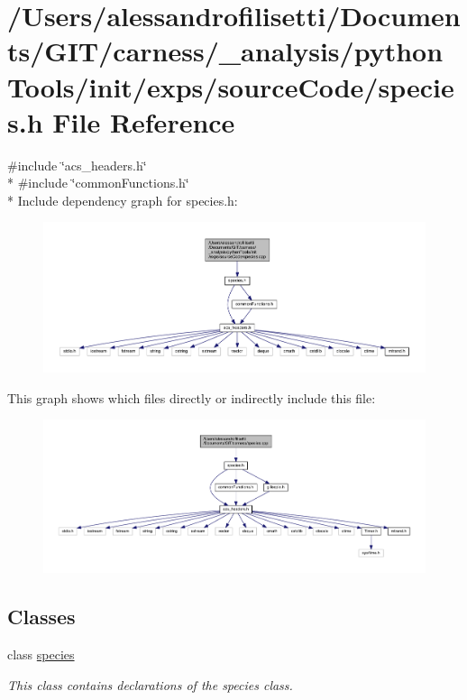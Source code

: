 \hypertarget{a00080}{\section{/\-Users/alessandrofilisetti/\-Documents/\-G\-I\-T/carness/\-\_\-analysis/python\-Tools/init/exps/source\-Code/species.h File Reference}
\label{a00080}
}
{\ttfamily \#include \char`\"{}acs\-\_\-headers.\-h\char`\"{}}\\*
{\ttfamily \#include \char`\"{}common\-Functions.\-h\char`\"{}}\\*
Include dependency graph for species.\-h\-:
\nopagebreak
\begin{figure}[H]
\begin{center}
\leavevmode
\includegraphics[width=350pt]{a00202}
\end{center}
\end{figure}
This graph shows which files directly or indirectly include this file\-:
\nopagebreak
\begin{figure}[H]
\begin{center}
\leavevmode
\includegraphics[width=350pt]{a00203}
\end{center}
\end{figure}
\subsection*{Classes}
\begin{DoxyCompactItemize}
\item 
class \hyperlink{a00022}{species}
\begin{DoxyCompactList}\small\item\em This class contains declarations of the species class. \end{DoxyCompactList}\end{DoxyCompactItemize}

